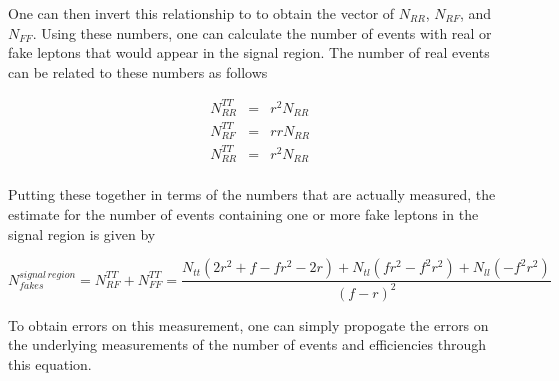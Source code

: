 One can then invert this relationship to to obtain the vector of $N_{RR}$, $N_{RF}$, and $N_{FF}$.
Using these numbers, one can calculate the number of events with real or fake leptons that would appear in the signal region.
The number of real events can be related to these numbers as follows

\begin{eqnarray*}
  N_{RR}^{TT} & = & r^2 N_{RR} \\  
  N_{RF}^{TT} & = & r r N_{RR} \\
  N_{RR}^{TT} & = & r^2 N_{RR} \\
\end{eqnarray*}

Putting these together in terms of the numbers that are actually measured, the estimate for the number of events containing one or more fake leptons in the signal region is given by

\begin{equation}
N_{fakes}^{signal \, region} =  N_{RF}^{TT} + N_{FF}^{TT} = \frac{ N_{tt}(2r^2 + f - fr^2-2r) + N_{tl}(fr^2-f^2r^2) + N_{ll}(-f^2r^2) }{(f-r)^2} 
\end{equation}


To obtain errors on this measurement, one can simply propogate the errors on the underlying measurements of the number of events and efficiencies through this equation.

